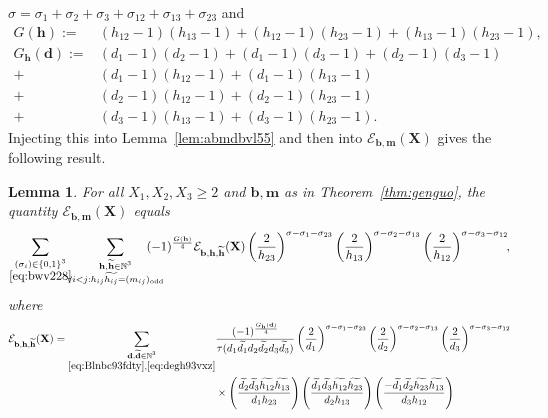 \documentclass[a4paper,12pt,reqno]{amsart}
\numberwithin{equation}{section} \numberwithin{figure}{section}
\newcommand\N{\mathbb{N}}
\renewcommand{\l}{\left}
\renewcommand{\r}{\right}
\renewcommand{\b}{\mathbf}
\renewcommand{\c}{\mathcal}
\renewcommand{\geq}{\geqslant}
\renewcommand{\#}{\sharp}
\newtheorem{lemma}{Lemma}
\theoremstyle{definition}
\numberwithin{lemma}{section}
\begin{document}
$\sigma= \sigma_ 1+   \sigma_2 +   \sigma_3 +   \sigma_{12}  +   \sigma_ {13} +   \sigma_{23}   $ and 
\begin{align*}
G(\b h ) := &  (h_{12}-1) (h_{13}-1)  +   (h_{12}-1) (h_{23}-1)  +    (h_{13}-1) (h_{23}-1)  ,  
\\   
G_{\b h }(\b d )   := & 
 (d_1 -1 )(d_2 -1 ) +(d_1 -1 )(d_3 -1 ) +(d_2 -1 )(d_3 -1 )
\\+ &  (d_1 -1 )(h_{12}  -1 ) +(d_1 -1 )(h_{13}  -1 )  
\\+ &  (d_2 -1 )(h_{12}  -1 )   +(d_2 -1 )(h_{23}  -1 )
\\+ &  (d_3 -1 )(h_{13}  -1 )   +(d_3 -1 )(h_{23}  -1 ) . \end{align*}  
Injecting this into Lemma~\ref{lem:abmdbvl55}  and then into $\mathcal{E}_{  \b b, \b m}( \b X) $ gives the following result.
\begin{lemma}\label{lem:pirates} 
For  all $X _1,X_2,X_3\geq 2 $    and $\b b , \b m $ as in Theorem~\ref{thm:genguo},
the quantity
  $\mathcal{E}_{  \b b, \b m}( \b X) $ equals  \[   \sum_{\substack{(\sigma_i)\in \{0,1\}^3 \\ \eqref{eq:bwv228}}}
\hspace{-0,2cm}
  \sum_{\substack{ \b h , \widetilde{\b h} \in \N^3 \\ \forall i< j :h_{ij } \widetilde{h_{ij}}= (m_{ij})_{\rm{odd}} }} 
\hspace{-0,5cm}
  (-1)^{\frac{G(\b h )}{4} } \c {E}_{  \b b,\b h ,  \widetilde{\b h } }( \b X )    
\l(\frac{2}{  h_{23} } \r)^{\sigma-\sigma_1-\sigma_{23} } \l(\frac{2}{  h_{13} } \r)^{\sigma-\sigma_2-\sigma_{13} }
\l(\frac{2}{  h_{12} } \r)^{\sigma-\sigma_3-\sigma_{12} } \!\! ,\] where   
\begin{align*}\mathcal{E}_{  \b b, \b h ,\widetilde{\b h }  }( \b X )  =  \sum_{\substack{ \b d, \widetilde{\b d}  \in   \N^3 \\
  \eqref {eq:Blnbc93fdty}, 
 \eqref{eq:degh93vxz}
}}
&\frac
{
 (-1)^{\frac{G_{\b h }(\b d)  }{4} }
 }{
\tau(  d_1 \widetilde{d_1}   d_2  \widetilde{d_2} d_3 \widetilde{d_3}  )} 
 \l(\frac{2}{  d_1 } \r)^{\sigma-\sigma_1-\sigma_{23} } \l(\frac{2}{  d_2 } \r)^{\sigma-\sigma_2-\sigma_{13} }
\l(\frac{2}{  d_3 } \r)^{\sigma-\sigma_3-\sigma_{12} }
 \\  &\times
  \l(\frac{          \widetilde{d_2 }   \widetilde{d_3}  \widetilde{h_{12} }    \widetilde{ h_{13} }    }{d_1   h_{23}  }\r) 
    \l(\frac{             \widetilde{d_1}   \widetilde{d_3}  \widetilde{h_{12} }      \widetilde{h_{23} }   }{d_2   h_{13}  }\r) 
\l(\frac{    -     \widetilde{d_1}  \widetilde{d_2 }  \widetilde{h_{23} }  \widetilde{ h_{13} }    }{d_3  h_{12} }\r)  

\end{align*}
\end{lemma}
\end{document}

